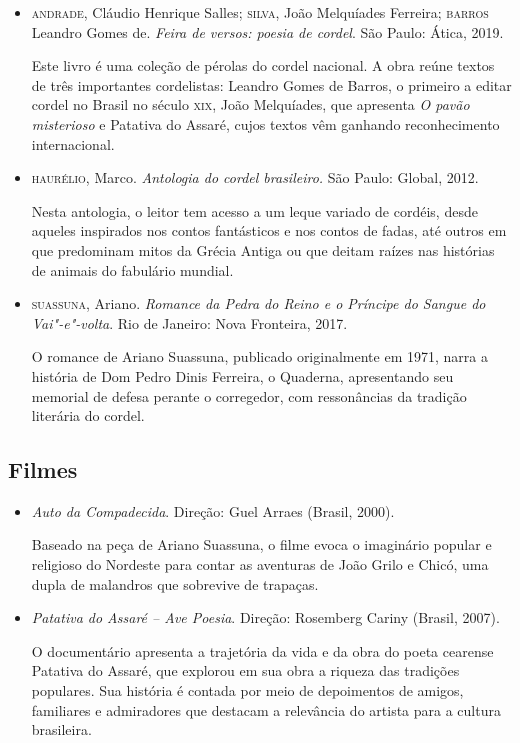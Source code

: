 \documentclass[12pt]{extarticle}
\begin{document}
\begin{itemize}
\item\textsc{andrade}, Cláudio Henrique Salles; \textsc{silva}, João Melquíades Ferreira;   \textsc{barros} Leandro Gomes de. \textit{Feira de versos: poesia de cordel}.
  São Paulo: Ática, 2019.
  
Este livro é uma coleção de pérolas do cordel nacional. A obra reúne
textos de três importantes cordelistas: Leandro Gomes de Barros, o
primeiro a editar cordel no Brasil no século \textsc{xix}, João Melquíades, que
apresenta \emph{O pavão misterioso} e Patativa do Assaré, cujos textos
vêm ganhando reconhecimento internacional.

\item\textsc{haurélio}, Marco. \textit{Antologia do cordel brasileiro.} São Paulo:
  Global, 2012.

Nesta antologia, o leitor tem acesso a um leque variado de cordéis,
desde aqueles inspirados nos contos fantásticos e nos contos de fadas,
até outros em que predominam mitos da Grécia Antiga ou que deitam raízes
nas histórias de animais do fabulário mundial.

\item\textsc{suassuna}, Ariano. \textit{Romance da Pedra do Reino e o Príncipe do
  Sangue do Vai"-e"-volta}. Rio de Janeiro: Nova Fronteira, 2017.


O romance de Ariano Suassuna, publicado originalmente em 1971, narra a
história de Dom Pedro Dinis Ferreira, o Quaderna, apresentando seu
memorial de defesa perante o corregedor, com ressonâncias da tradição
literária do cordel.
\end{itemize}

\subsection{Filmes}
\begin{itemize}
\item\textit{Auto da Compadecida}. Direção: Guel Arraes (Brasil, 2000).

Baseado na peça de Ariano Suassuna, o filme evoca o imaginário popular e
religioso do Nordeste para contar as aventuras de João Grilo e Chicó,
uma dupla de malandros que sobrevive de trapaças.

\item\textit{Patativa do Assaré -- Ave Poesia}. Direção: Rosemberg Cariny (Brasil, 2007).

O documentário apresenta a trajetória da vida e da obra do poeta
cearense Patativa do Assaré, que explorou em sua obra a riqueza das
tradições populares. Sua história é contada por meio de depoimentos de
amigos, familiares e admiradores que destacam a relevância do artista
para a cultura brasileira.
\end{itemize}
\end{document}
